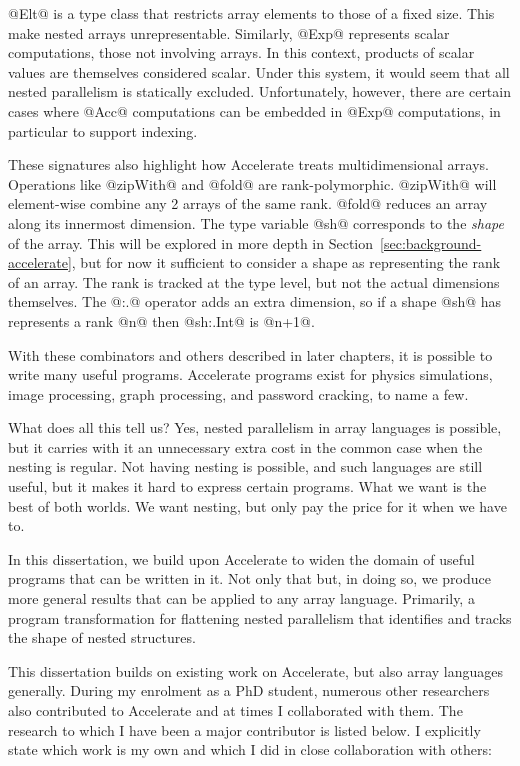 @Elt@ is a type class that restricts array elements to those of a fixed size. This make nested arrays unrepresentable. Similarly, @Exp@ represents scalar computations, those not involving arrays. In this context, products of scalar values are themselves considered scalar. Under this system, it would seem that all nested parallelism is statically excluded. Unfortunately, however, there are certain cases where @Acc@ computations can be embedded in @Exp@ computations, in particular to support indexing.

These signatures also highlight how Accelerate treats multidimensional arrays. Operations like @zipWith@ and @fold@ are rank-polymorphic. @zipWith@ will element-wise combine any 2 arrays of the same rank. @fold@ reduces an array along its innermost dimension. The type variable @sh@ corresponds to the \emph{shape} of the array. This will be explored in more depth in Section~\ref{sec:background-accelerate}, but for now it sufficient to consider a shape as representing the rank of an array. The rank is tracked at the type level, but not the actual dimensions themselves. The @:.@ operator adds an extra dimension, so if a shape @sh@ has represents a rank @n@ then @sh:.Int@ is @n+1@.

With these combinators and others described in later chapters, it is possible to write many useful programs. Accelerate programs exist for physics simulations, image processing, graph processing, and password cracking, to name a few.

What does all this tell us? Yes, nested parallelism in array languages is possible, but it carries with it an unnecessary extra cost in the common case when the nesting is regular. Not having nesting is possible, and such languages are still useful, but it makes it hard to express certain programs. What we want is the best of both worlds. We want nesting, but only pay the price for it when we have to.

In this dissertation, we build upon Accelerate to widen the domain of useful programs that can be written in it. Not only that but, in doing so, we produce more general results that can be applied to any array language. Primarily, a program transformation for flattening nested parallelism that identifies and tracks the shape of nested structures.

This dissertation builds on existing work on Accelerate, but also array languages generally. During my enrolment as a PhD student, numerous other researchers also contributed to Accelerate and at times I collaborated with them. The research to which I have been a major contributor is listed below. I explicitly state which work is my own and which I did in close collaboration with others:

